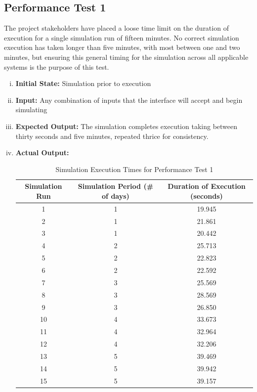 \documentclass[paper=letter, fontsize=10pt]{scrartcl}
\numberwithin{equation}{section}		%
\numberwithin{figure}{section}			%
\numberwithin{table}{section}				%
\begin{document}
\subsection{Performance Test 1}
The project stakeholders have placed a loose time limit on the duration of execution for a single simulation run of fifteen minutes. No correct simulation execution has taken longer than five minutes, with most between one and two minutes, but ensuring this general timing for the simulation across all applicable systems is the purpose of this test.
\begin{enumerate}[(i)]
	\item \textbf{Initial State:} Simulation prior to execution 
	\item \textbf{Input:} Any combination of inputs that the interface will accept and begin simulating
	\item \textbf{Expected Output:} The simulation completes execution taking between thirty seconds and five minutes, repeated thrice for consistency.
	\item \textbf{Actual Output:}
	\begin{table}
	\caption{Simulation Execution Times for Performance Test 1}
	\begin{center}
    	\begin{tabular}{| c | c | c |}
    		\hline
        	Simulation Run & Simulation Period (\# of days) & Duration of Execution (seconds) \\ \hline
  			1 & 1 & 19.945 \\ \hline
  			2 & 1 & 21.861 \\ \hline
  			3 & 1 & 20.442 \\ \hline
  			4 & 2 & 25.713 \\ \hline
  			5 & 2 & 22.823 \\ \hline
  			6 & 2 & 22.592 \\ \hline
  			7 & 3 & 25.569 \\ \hline
  			8 & 3 & 28.569 \\ \hline
  			9 & 3 & 26.850 \\ \hline
  			10 & 4 & 33.673 \\ \hline
  			11 & 4 & 32.964 \\ \hline
  			12 & 4 & 32.206 \\ \hline
  			13 & 5 & 39.469 \\ \hline
  			14 & 5 & 39.942 \\ \hline
  			15 & 5 & 39.157 \\ \hline
    	\end{tabular}
	\end{center}
	\end{table}
		
\end{enumerate}
\end{document}
